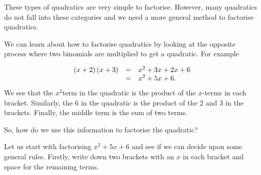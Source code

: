 \label{m39394*id275654}These types of quadratics are very simple to factorise. However, many quadratics do not fall into these categories and we need a more general method to factorise quadratics.
\par 
\label{m39394*id275684}We can learn about how to factorise quadratics by looking at the opposite process where two binomials are multiplied to get a quadratic. For example

\begin{equation*}
\begin{array}{ccl}\hfill \left(x+2\right)\left(x+3\right)& =& x^2+3x+2x+6 \\ & =& {x}^{2}+5x+6.\hfill \end{array}
\end{equation*}
\label{m39394*id275871}We see that the ${x}^{2}$\hspace{1ex}term in the quadratic is the product of the $x$-terms in each bracket. Similarly, the $6$ in the quadratic is the product of the $2$ and $3$ in the brackets. Finally, the middle term is the sum of two terms.\par 
\label{m39394*id275901}So, how do we use this information to factorise the quadratic?\par 
\label{m39394*id275905}Let us start with factorising ${x}^{2}+5x+6$ \hspace{1ex}and see if we can decide upon some general rules. Firstly, write down two brackets with an $x$ in each bracket and space for the remaining terms.\par 
\label{m39394*id275944}\nopagebreak\noindent{}

